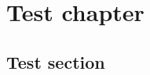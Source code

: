 \documentclass{book}
\begin{document}
	
	\chapter{Test chapter}
	\lipsum[2]
	\section{Test section}
	\lipsum[2]\lipsum[2]\lipsum[2]\lipsum[2]\lipsum[2]
	
\end{document}

